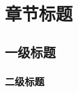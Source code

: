 \documentclass[degree=master, language=english, fontset=fandol]{sjtuthesis}
\begin{document}
\maketitle
\makeDeclareOriginal
\makeDeclareAuthorization

\frontmatter %



\tableofcontents


\mainmatter %

\chapter{章节标题}
\section{一级标题}
\subsection{二级标题}
\zhlipsum[1]
% 
% 
% 
% 

\appendix %

% 
% 
% 
% 

\backmatter %


\makeatletter




%       
%       
%       

\end{document}
